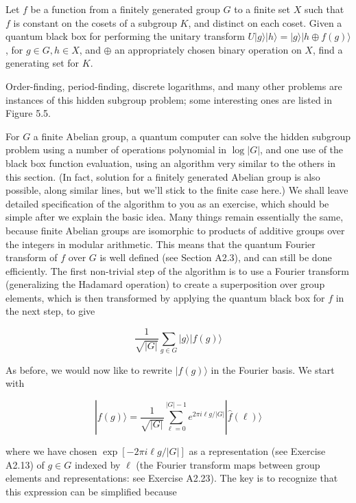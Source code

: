 Let $f$ be a function from a finitely generated group $G$ to a finite set $X$ such that $f$ is constant on the cosets of a subgroup $K$, and distinct on each coset. Given a quantum black box for performing the unitary transform $U|g\rangle|h\rangle=|g\rangle|h \oplus f(g)\rangle$, for $g \in G, h \in X$, and $\oplus$ an appropriately chosen binary operation on $X$, find a generating set for $K$.

Order-finding, period-finding, discrete logarithms, and many other problems are instances of this hidden subgroup problem; some interesting ones are listed in Figure 5.5.

For $G$ a finite Abelian group, a quantum computer can solve the hidden subgroup problem using a number of operations polynomial in $\log |G|$, and one use of the black box function evaluation, using an algorithm very similar to the others in this section. (In fact, solution for a finitely generated Abelian group is also possible, along similar lines, but we'll stick to the finite case here.) We shall leave detailed specification of the algorithm to you as an exercise, which should be simple after we explain the basic idea. Many things remain essentially the same, because finite Abelian groups are isomorphic to products of additive groups over the integers in modular arithmetic. This means that the quantum Fourier transform of $f$ over $G$ is well defined (see Section A2.3), and can still be done efficiently. The first non-trivial step of the algorithm is to use a Fourier transform (generalizing the Hadamard operation) to create a superposition over group elements, which is then transformed by applying the quantum black box for $f$ in the next step, to give

\begin{equation*}
\frac{1}{\sqrt{|G|}} \sum_{g \in G}|g\rangle|f(g)\rangle \tag{5.74}
\end{equation*}

As before, we would now like to rewrite $|f(g)\rangle$ in the Fourier basis. We start with

\begin{equation*}
|f(g)\rangle=\frac{1}{\sqrt{|G|}} \sum_{\ell=0}^{|G|-1} e^{2 \pi i \ell g /|G|}|\hat{f}(\ell)\rangle \tag{5.75}
\end{equation*}

where we have chosen $\exp [-2 \pi i \ell g /|G|]$ as a representation (see Exercise A2.13) of $g \in G$ indexed by $\ell$ (the Fourier transform maps between group elements and representations: see Exercise A2.23). The key is to recognize that this expression can be simplified because

